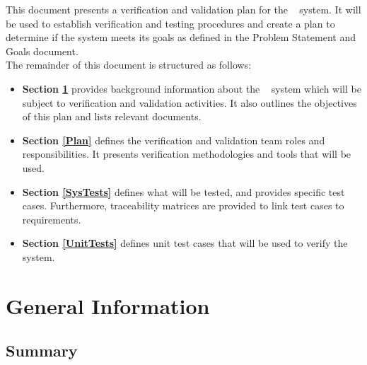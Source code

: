 \documentclass[12pt, titlepage]{article}
\begin{document}



\newpage

  
This document presents a verification and validation plan for the \progname~ system. It will be used to establish verification and testing procedures and create a plan to determine if the system meets its goals as defined in the Problem Statement and Goals document.\\
\newline
\noindent The remainder of this document is structured as follows:

\begin{itemize}
  \item \textbf{Section \ref{GeneralInfo}} provides background information about the \progname~ system which will be subject to verification and validation activities. It also outlines the objectives of this plan and lists relevant documents.
  \item \textbf{Section \ref{Plan}} defines the verification and validation team roles and responsibilities. It presents verification methodologies and tools that will be used.
  \item \textbf{Section \ref{SysTests}} defines what will be tested, and provides specific test cases. Furthermore, traceability matrices are provided to link test cases to requirements.
  \item \textbf{Section \ref{UnitTests}} defines unit test cases that will be used to verify the system.
\end{itemize}

\section{General Information} \label{GeneralInfo}

\subsection{Summary}

  
\end{document}

